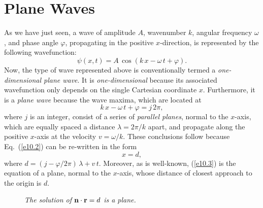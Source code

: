 \section{Plane Waves}
As we have just seen, a  wave of amplitude $A$, wavenumber $k$,  angular frequency $\omega$, and phase
angle $\varphi$, 
propagating in the positive $x$-direction,  is  represented by the following wavefunction:
\begin{equation}\label{e10.1}
\psi(x,t)=A\,\cos(k\,x-\omega\,t+\varphi).
\end{equation}
Now, the   type of wave represented above is conventionally termed  a {\em one-dimen\-sio\-nal plane wave}. It is {\em one-dimensional}\/
because its associated wavefunction only depends on the single Cartesian coordinate $x$. 
Furthermore, it is a {\em plane wave}\/ because the wave maxima, which are located at
\begin{equation}\label{e10.2}
k\,x-\omega\,t+\varphi  = j\,2\pi,
\end{equation}
where $j$ is an integer, consist of a series of {\em parallel planes},  normal to the $x$-axis, which are equally spaced a distance
$\lambda=2\pi/k$ apart, and propagate along the
positive $x$-axis at the velocity $v=\omega/k$. 
These conclusions follow because Eq.~(\ref{e10.2}) can be re-written in the form
\begin{equation}\label{e10.3}
x= d,
\end{equation}
where $d=(j-\varphi/2\pi)\,\lambda + v\,t$. Moreover, as is well-known, (\ref{e10.3})
is  the equation of a plane, normal to the $x$-axis,  whose distance of closest approach to the
origin is $d$. 

\begin{figure}
\epsfysize=2.5in
\centerline{}
\caption{\em The solution of ${\bf n}\cdot{\bf r} = d$ is a plane.}\label{f10.1}   
\end{figure}

